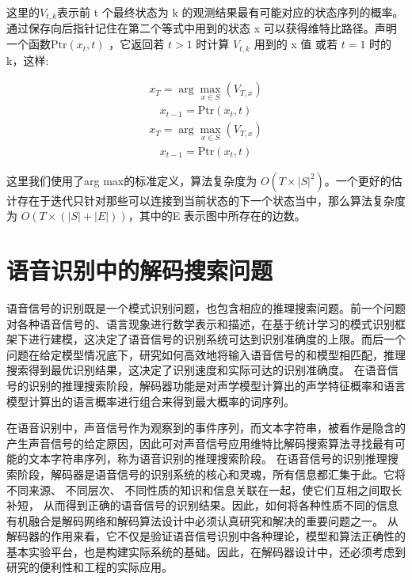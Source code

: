 这里的$V_{t,k}$表示前 t 个最终状态为 k 的观测结果最有可能对应的状态序列的概率。通过保存向后指针记住在第二个等式中用到的状态 x 可以获得维特比路径。声明一个函数$\mathrm {Ptr} (x_{t},t)$ ，它返回若 $t>1$ 时计算 $V_{t,k}$ 用到的 x 值 或若 $t=1$ 时的 k，这样:


\begin{equation}
\begin{split}
x_{T}=\arg \max_{x\in S}(V_{T,x})
\end{split}
\end{equation}
\begin{equation}
\begin{split}
x_{t-1}=\mathrm {Ptr} (x_{t},t)
\end{split}
\end{equation}
\begin{equation}
\begin{split}
x_{T}=\arg \max _{x\in S}(V_{T,x})
\end{split}
\end{equation}
\begin{equation}
\begin{split}
x_{t-1}=\mathrm {Ptr} (x_{t},t)
\end{split}
\end{equation}

这里我们使用了arg max的标准定义，算法复杂度为 $O(T\times \left|{S}\right|^{2})$。一个更好的估计存在于迭代只针对那些可以连接到当前状态的下一个状态当中，那么算法复杂度为 $O(T\times (\left|{S}\right|+\left|{E}\right|))$，其中的E 表示图中所存在的边数。

\section{语音识别中的解码搜索问题}
\label{chap:intro-asr-dec}

语音信号的识别既是一个模式识别问题，也包含相应的推理搜索问题。前一个问题对各种语音信号的、语言现象进行数学表示和描述，在基于统计学习的模式识别框架下进行建模，这决定了语音信号的识别系统可达到识别准确度的上限。而后一个问题在给定模型情况底下，研究如何高效地将输入语音信号的和模型相匹配，推理搜索得到最优识别结果，这决定了识别速度和实际可达的识别准确度。
在语音信号的识别的推理搜索阶段，解码器功能是对声学模型计算出的声学特征概率和语言模型计算出的语言概率进行组合来得到最大概率的词序列。

在语音识别中，声音信号作为观察到的事件序列，而文本字符串，被看作是隐含的产生声音信号的给定原因，因此可对声音信号应用维特比解码搜索算法寻找最有可能的文本字符串序列，称为语音识别的推理搜索阶段。
%
在语音信号的识别推理搜索阶段，解码器是语音信号的识别系统的核心和灵魂，所有信息都汇集于此。它将不同来源、 不同层次、 不同性质的知识和信息关联在一起，使它们互相之间取长补短， 从而得到正确的语音信号的识别结果。因此，如何将各种性质不同的信息有机融合是解码网络和解码算法设计中必须认真研究和解决的重要问题之一。
从解码器的作用来看，它不仅是验证语音信号识别中各种理论，模型和算法正确性的基本实验平台，也是构建实际系统的基础。因此，在解码器设计中，还必须考虑到研究的便利性和工程的实际应用。

